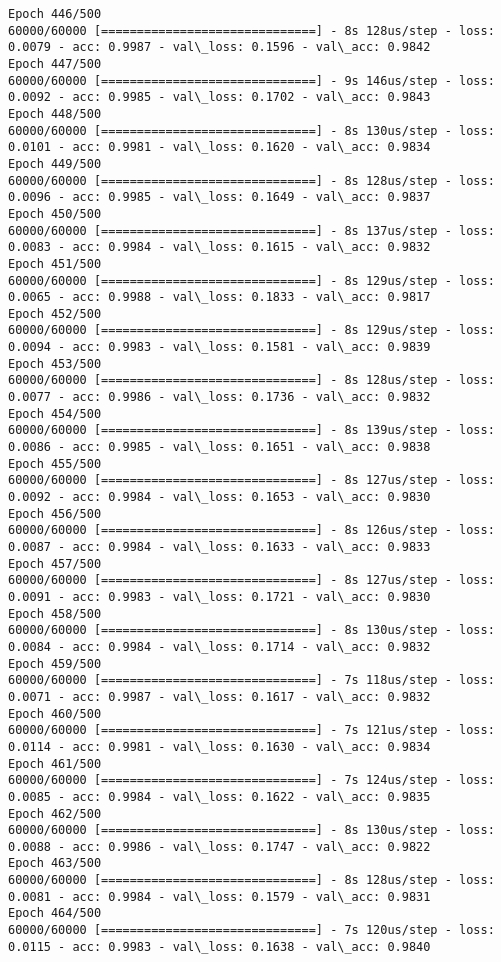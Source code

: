 \documentclass[11pt]{article}
\begin{document}
\begin{Verbatim}[commandchars=\\\{\}]
Epoch 446/500
60000/60000 [==============================] - 8s 128us/step - loss: 0.0079 - acc: 0.9987 - val\_loss: 0.1596 - val\_acc: 0.9842
Epoch 447/500
60000/60000 [==============================] - 9s 146us/step - loss: 0.0092 - acc: 0.9985 - val\_loss: 0.1702 - val\_acc: 0.9843
Epoch 448/500
60000/60000 [==============================] - 8s 130us/step - loss: 0.0101 - acc: 0.9981 - val\_loss: 0.1620 - val\_acc: 0.9834
Epoch 449/500
60000/60000 [==============================] - 8s 128us/step - loss: 0.0096 - acc: 0.9985 - val\_loss: 0.1649 - val\_acc: 0.9837
Epoch 450/500
60000/60000 [==============================] - 8s 137us/step - loss: 0.0083 - acc: 0.9984 - val\_loss: 0.1615 - val\_acc: 0.9832
Epoch 451/500
60000/60000 [==============================] - 8s 129us/step - loss: 0.0065 - acc: 0.9988 - val\_loss: 0.1833 - val\_acc: 0.9817
Epoch 452/500
60000/60000 [==============================] - 8s 129us/step - loss: 0.0094 - acc: 0.9983 - val\_loss: 0.1581 - val\_acc: 0.9839
Epoch 453/500
60000/60000 [==============================] - 8s 128us/step - loss: 0.0077 - acc: 0.9986 - val\_loss: 0.1736 - val\_acc: 0.9832
Epoch 454/500
60000/60000 [==============================] - 8s 139us/step - loss: 0.0086 - acc: 0.9985 - val\_loss: 0.1651 - val\_acc: 0.9838
Epoch 455/500
60000/60000 [==============================] - 8s 127us/step - loss: 0.0092 - acc: 0.9984 - val\_loss: 0.1653 - val\_acc: 0.9830
Epoch 456/500
60000/60000 [==============================] - 8s 126us/step - loss: 0.0087 - acc: 0.9984 - val\_loss: 0.1633 - val\_acc: 0.9833
Epoch 457/500
60000/60000 [==============================] - 8s 127us/step - loss: 0.0091 - acc: 0.9983 - val\_loss: 0.1721 - val\_acc: 0.9830
Epoch 458/500
60000/60000 [==============================] - 8s 130us/step - loss: 0.0084 - acc: 0.9984 - val\_loss: 0.1714 - val\_acc: 0.9832
Epoch 459/500
60000/60000 [==============================] - 7s 118us/step - loss: 0.0071 - acc: 0.9987 - val\_loss: 0.1617 - val\_acc: 0.9832
Epoch 460/500
60000/60000 [==============================] - 7s 121us/step - loss: 0.0114 - acc: 0.9981 - val\_loss: 0.1630 - val\_acc: 0.9834
Epoch 461/500
60000/60000 [==============================] - 7s 124us/step - loss: 0.0085 - acc: 0.9984 - val\_loss: 0.1622 - val\_acc: 0.9835
Epoch 462/500
60000/60000 [==============================] - 8s 130us/step - loss: 0.0088 - acc: 0.9986 - val\_loss: 0.1747 - val\_acc: 0.9822
Epoch 463/500
60000/60000 [==============================] - 8s 128us/step - loss: 0.0081 - acc: 0.9984 - val\_loss: 0.1579 - val\_acc: 0.9831
Epoch 464/500
60000/60000 [==============================] - 7s 120us/step - loss: 0.0115 - acc: 0.9983 - val\_loss: 0.1638 - val\_acc: 0.9840

\end{Verbatim}
\end{document}
